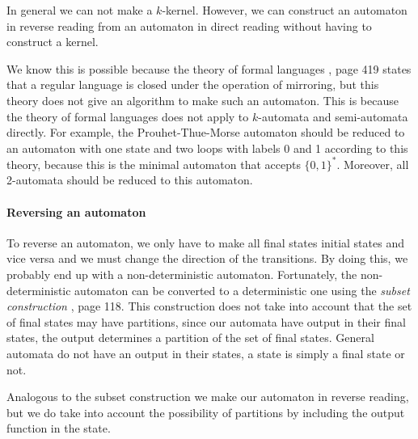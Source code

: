 \documentclass{article}
\theoremstyle{definition}
\begin{document}
In general we can not make a $k$-kernel. However, we can construct an automaton
in reverse reading from an automaton in direct reading without having to 
construct a kernel.

We know this is possible because the theory of formal languages \cite{Wood}, 
page 419 states that a regular language is closed under the operation of 
mirroring, but this theory does not give an algorithm to make such an 
automaton. This is because the theory of formal languages does not apply to 
$k$-automata and semi-automata directly. For example, the Prouhet-Thue-Morse 
automaton should be reduced to an automaton with one state and two loops with 
labels 0 and 1 according to this theory, because this is the minimal automaton 
that accepts $\{0, 1\}^*$. Moreover, all 2-automata should be reduced to this 
automaton.

\paragraph{Reversing an automaton}
To reverse an automaton, we only have to make all final states initial states
and vice versa and we must change the direction of the transitions. By doing 
this, we probably end up with a non-deterministic automaton. 
Fortunately, the non-deterministic automaton can be converted to a 
deterministic one using the \emph{subset construction} \cite{Wood}, page 118. 
This construction does not take into account that the set of final states may 
have partitions, since our automata have output in their final states, the 
output determines a partition of the set of final states. General automata do 
not have an output in their states, a state is simply a final state or not.

Analogous to the subset construction we make our automaton in reverse reading, 
but we do take into account the possibility of partitions by including the 
output function in the state.
\end{document}
